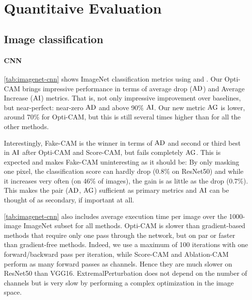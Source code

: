 \section{Quantitaive Evaluation}
\label{sec:oc_quant}
\subsection{Image classification}

\paragraph{CNN}
\autoref{tab:imagenet-cnn} shows ImageNet classification metrics using  and .
 Our Opti-CAM brings impressive performance in terms of average drop ($\operatorname{AD}$) and Average Increase 
 ($\operatorname{AI}$) metrics. That is, not only impressive improvement over baselines, but near-perfect: 
 near-zero $\operatorname{AD}$ and above 90\% $\operatorname{AI}$. Our new metric $\operatorname{AG}$ is lower, around 70\% 
 for Opti-CAM, but this is still several times higher than for all the other methods.

Interestingly, Fake-CAM \autocite{poppi2021revisiting} is the winner in terms of $\operatorname{AD}$ and second 
or third best in $\operatorname{AI}$ after Opti-CAM and Score-CAM, but fails completely $\operatorname{AG}$. This is expected 
and makes Fake-CAM uninteresting as it should be: By only masking one pixel, the classification 
score can hardly drop (0.8\% on ResNet50) and while it increases very often (on 46\% of images), 
the gain is as little as the drop (0.7\%). This makes the pair ($\operatorname{AD}$, $\operatorname{AG}$) sufficient as primary
 metrics and $\operatorname{AI}$ can be thought of as secondary, if important at all.



\autoref{tab:imagenet-cnn} also includes average execution time per image over the 1000-image 
ImageNet subset for all methods. Opti-CAM is slower than gradient-based methods that require 
only one pass through the network, but on par or faster than gradient-free methods. 
Indeed, we use a maximum of 100 iterations with one forward/backward pass per iteration, 
while Score-CAM and Ablation-CAM perform as many forward passes as channels. Hence they are much 
slower on ResNet50 than VGG16. ExtremalPerturbation does not depend on the number of channels but 
is very slow by performing a complex optimization in the image space.

